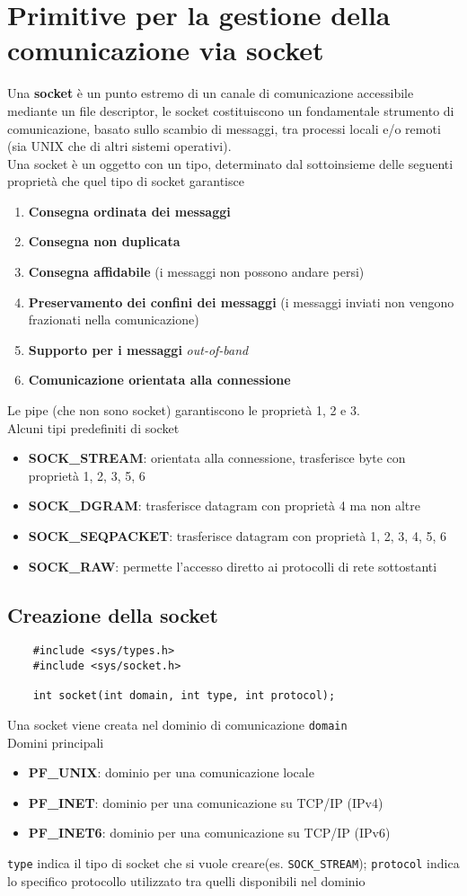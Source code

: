 \documentclass[italian,12pt,a4paper]{article}
\begin{document}
\section{Primitive per la gestione della comunicazione via socket}
Una \textbf{socket} è un punto estremo di un canale di comunicazione accessibile mediante un file descriptor, le socket costituiscono un fondamentale strumento di comunicazione, basato sullo scambio di messaggi, tra processi locali e/o remoti (sia UNIX che di altri sistemi operativi).\\
Una socket è un oggetto con un tipo, determinato dal sottoinsieme delle seguenti proprietà che quel tipo di socket garantisce
\begin{enumerate}
	\item \textbf{Consegna ordinata dei messaggi}
	\item \textbf{Consegna non duplicata}
	\item \textbf{Consegna affidabile} (i messaggi non possono andare persi)
	\item \textbf{Preservamento dei confini dei messaggi} (i messaggi inviati non vengono frazionati nella comunicazione)
	\item \textbf{Supporto per i messaggi} \textit{out-of-band}
	\item \textbf{Comunicazione orientata alla connessione}
\end{enumerate}
Le pipe (che non sono socket) garantiscono le proprietà 1, 2 e 3.\\
Alcuni tipi predefiniti di socket
\begin{itemize}
	\item \textbf{SOCK\_STREAM}: orientata alla connessione, trasferisce byte con proprietà 1, 2, 3, 5, 6
	\item \textbf{SOCK\_DGRAM}: trasferisce datagram con proprietà 4 ma non altre
	\item \textbf{SOCK\_SEQPACKET}: trasferisce datagram con proprietà 1, 2, 3, 4, 5, 6
	\item \textbf{SOCK\_RAW}: permette l'accesso diretto ai protocolli di rete sottostanti
\end{itemize}
\subsection{Creazione della socket}
\begin{verbatim}
	#include <sys/types.h>
	#include <sys/socket.h>
	
	int socket(int domain, int type, int protocol);
\end{verbatim}
Una socket viene creata nel dominio di comunicazione \verb|domain|\\
Domini principali
\begin{itemize}
	\item \textbf{PF\_UNIX}: dominio per una comunicazione locale
	\item \textbf{PF\_INET}: dominio per una comunicazione su TCP/IP (IPv4)
	\item \textbf{PF\_INET6}: dominio per una comunicazione su TCP/IP (IPv6)
\end{itemize}
\verb|type| indica il tipo di socket che si vuole creare(es. \verb|SOCK_STREAM|); \verb|protocol| indica lo specifico protocollo utilizzato tra quelli disponibili nel dominio
\end{document}
